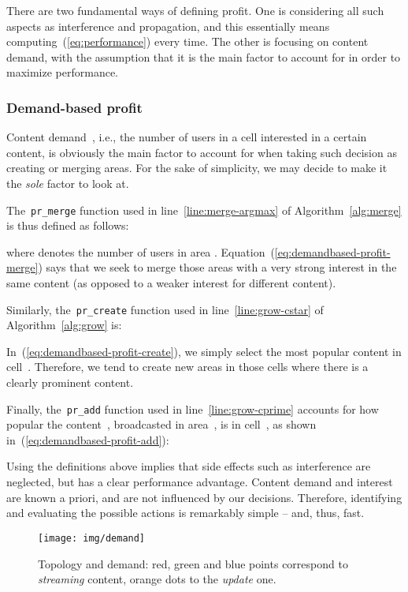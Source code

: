\documentclass[10pt, conference, compsocconf]{IEEEtran}
\numberwithin{equation}{section}
\begin{document}
There are two fundamental ways of defining profit. One is considering all such aspects as
interference and propagation, and this essentially means computing~(\ref{eq:performance}) every time.
The other is focusing on content demand, with the assumption that it is the main
factor to account for in order to maximize performance.

\subsubsection{Demand-based profit}

Content demand~, i.e., the number of users in a cell interested
in a certain content, is obviously
the main factor to account for when taking such decision as creating or merging areas. For
the sake of simplicity, we may decide to make it the {\em sole} factor to look at.

The~\texttt{pr\_merge} function used in line~\ref{line:merge-argmax} of Algorithm~\ref{alg:merge}
is thus defined as follows:

where  denotes the number of users in area . 
Equation~(\ref{eq:demandbased-profit-merge}) says that we seek to merge those areas with a very
strong interest in the same content (as opposed to a weaker interest for different
content).

Similarly, the~\texttt{pr\_create} function used in line~\ref{line:grow-cstar} of
Algorithm~\ref{alg:grow} is:

In~(\ref{eq:demandbased-profit-create}), we simply select the most popular content in cell~.
Therefore, we tend to create new areas in those cells where there is a clearly prominent
content.

Finally, the~\texttt{pr\_add} function used in line~\ref{line:grow-cprime} accounts for
how popular the content~, broadcasted in area~, is in cell~, as shown
in~(\ref{eq:demandbased-profit-add}):


Using the definitions above implies that side effects such as
interference are neglected, but has a
clear performance advantage. Content demand and interest are known a priori, and are not
influenced by our decisions. Therefore, identifying and evaluating the possible actions
is remarkably simple -- and, thus, fast.

\begin{figure}
\centering
\texttt{[image: img/demand]}
\caption{Topology and demand: red, green and blue points correspond to {\em streaming} content,
orange dots to the {\em update} one.
\label{fig:topology}}
\end{figure}
\end{document}
